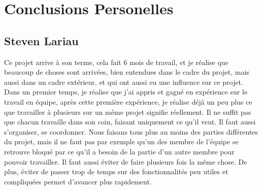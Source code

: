 \documentclass[12pt]{article}
\begin{document}
\section{Conclusions Personelles}

\subsection{Steven Lariau}

Ce projet arrive à son terme, cela fait 6 mois de travail, et je réalise que beaucoup de choses sont arrivées, bien entendues dans le cadre du projet, mais aussi dans un cadre extérieur, et qui ont aussi eu une influence sur ce projet.\\
Dans un premier temps, je réalise que j'ai appris et gagné en expérience sur le travail en équipe, après cette première expérience, je réalise déjà un peu plus ce que travailler à plusieurs sur un même projet signifie réellement. Il ne suffit pas que chacun travaille dans son coin, faisant uniquement ce qu'il veut. Il faut aussi s'organiser, se coordonner. Nous faisans tous plus au moins des parties différentes du projet, mais il ne faut pas par exemple qu'un des membre de l'équipe se retrouve bloqué par ce qu'il a besoin de la partie d'un autre membre pour pouvoir travailler. Il faut aussi éviter de faire plusieurs fois la même chose. De plus, éviter de passer trop de temps sur des fonctionnalités peu utiles et compliquées permet d'avancer plus rapidement.\\
\end{document}
